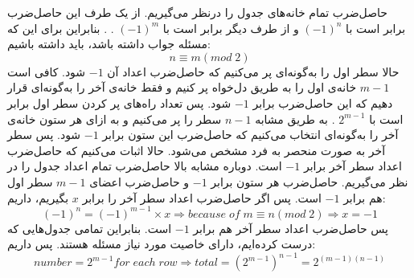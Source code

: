 \p
حاصل‌ضرب تمام خانه‌های جدول را درنظر می‌گیریم. از یک طرف این حاصل‌ضرب برابر است با
$(-1)^n$
و از طرف دیگر برابر است با
$(-1)^m$
.
. بنابراین برای این که مسئله جواب داشته باشد، باید داشته باشیم:
$$n \equiv m (mod\;2)$$
حالا سطر اول را به‌گونه‌ای پر می‌کنیم که حاصل‌ضرب اعداد آن
$-1$
شود. کافی است
$m - 1$
خانه‌ی اول را به طریق دل‌خواه پر کنیم و فقط خانه‌ی آخر را به‌گونه‌ای قرار دهیم که این حاصل‌ضرب برابر
$-1$
شود. پس تعداد راه‌های پر کردن سطر اول برابر است با
$2^{m-1}$
. به طریق مشابه
$n - 1$
سطر را پر می‌کنیم و به ازای هر ستون خانه‌ی آخر را به‌گونه‌ای انتخاب می‌کنیم که حاصل‌ضرب این ستون برابر
$-1$
شود. پس سطر آخر به صورت منحصر به فرد مشخص می‌شود. حالا اثبات می‌کنیم که حاصل‌ضرب اعداد سطر آخر برابر
$-1$
است. دوباره مشابه بالا حاصل‌ضرب تمام اعداد جدول را در نظر می‌گیریم.
\p
حاصل‌ضرب هر ستون برابر
$-1$
و حاصل‌ضرب اعضای
$m - 1$
سطر اول هم برابر
$-1$
است. پس اگر حاصل‌ضرب اعداد سطر آخر را برابر
$x$
بگیریم، داریم:
$$(-1)^n = (-1)^{m-1} \times x \Rightarrow because\;of\;m \equiv n(mod\;2) \Rightarrow x = -1$$
پس حاصل‌ضرب اعداد سطر آخر هم برابر
$-1$
است. بنابراین تمامی جدول‌هایی که درست کرده‌ایم، دارای خاصیت مورد نیاز مسئله هستند. پس داریم:
$$number = 2^{m-1} for\;each\;row \Rightarrow total = (2^{m-1})^{n-1} = 2^{(m-1)(n-1)}$$